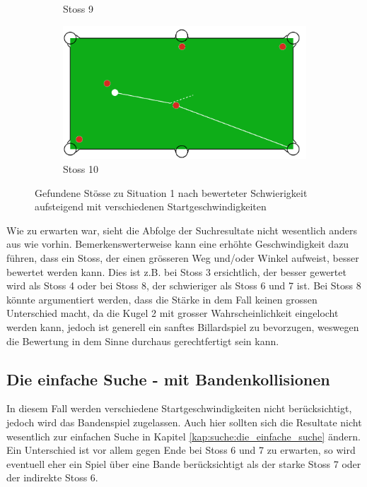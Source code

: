 \begin{figure}[h!]
\begin{subfigure}[b]{0.3\textwidth}
        \caption{Stoss 9}
        \label{fig:situation_velocity_1_solution_9}
    \end{subfigure}
    \hfill
    \begin{subfigure}[b]{0.3\textwidth}
        \centering
        \includegraphics[width=1.0\linewidth]{../common/04_results/resources/simple_search/situation_diverse_solution_velocity_10.PNG}
        \caption{Stoss 10}
        \label{fig:situation_velocity_1_solution_10}
    \end{subfigure}
    \caption{Gefundene Stösse zu Situation 1 nach bewerteter Schwierigkeit aufsteigend mit verschiedenen Startgeschwindigkeiten}
    \label{fig:situation_1_solutions_startgeschwindigkeit}
\end{figure}

Wie zu erwarten war, sieht die Abfolge der Suchresultate nicht wesentlich anders aus wie vorhin.
Bemerkenswerterweise kann eine erhöhte Geschwindigkeit dazu führen, dass ein Stoss,
der einen grösseren Weg und/oder Winkel aufweist, besser bewertet werden kann.
Dies ist z.B. bei Stoss 3 ersichtlich, der besser gewertet wird als Stoss 4 oder bei
Stoss 8, der schwieriger als Stoss 6 und 7 ist. Bei Stoss 8 könnte argumentiert werden, dass die Stärke
in dem Fall keinen grossen Unterschied macht, da die Kugel 2 mit grosser Wahrscheinlichkeit eingelocht werden kann,
jedoch ist generell ein sanftes Billardspiel zu bevorzugen, weswegen die Bewertung in dem Sinne durchaus gerechtfertigt
sein kann.

\subsection{Die einfache Suche - mit Bandenkollisionen}
In diesem Fall werden verschiedene Startgeschwindigkeiten nicht berücksichtigt, jedoch wird das Bandenspiel zugelassen.
Auch hier sollten sich die Resultate nicht wesentlich zur einfachen Suche in Kapitel \ref{kap:suche:die_einfache_suche} ändern.
Ein Unterschied ist vor allem gegen Ende bei Stoss 6 und 7 zu erwarten, so wird eventuell eher ein Spiel über eine Bande berücksichtigt
als der starke Stoss 7 oder der indirekte Stoss 6.

